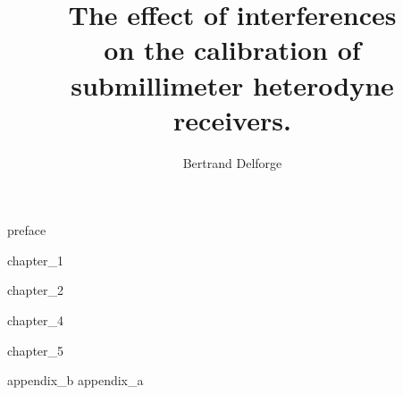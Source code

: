 \documentclass[a4paper,11pt]{book}
\newif\ifDraft
\begin{document}
\pagestyle{fancy}

\frontmatter
    \title{
        The effect of interferences\\
        on the calibration of\\
        submillimeter heterodyne receivers.\\
    }
    \author{Bertrand Delforge}
    \maketitle
    \setcounter{secnumdepth}{3}
    \setcounter{tocdepth}{2}
    \ifDraft
       \renewcommand*\contentsname{Content \today}
    \fi
    \tableofcontents
    {preface}
\mainmatter

    {chapter_1}

    {chapter_2}

    {chapter_4}

    {chapter_5}


    \begin{appendices}
        {appendix_b}
        {appendix_a}
    \end{appendices}

\backmatter

    \printbibliography[
        heading=bibintoc,
        ]


\end{document}
